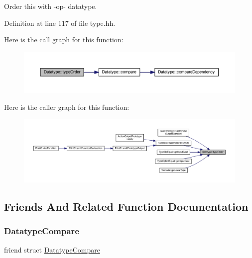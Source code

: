 Order this with -\/op-\/ datatype. 



Definition at line 117 of file type.\+hh.

Here is the call graph for this function\+:
\nopagebreak
\begin{figure}[H]
\begin{center}
\leavevmode
\includegraphics[width=350pt]{class_datatype_a97e8ffb05266d744b2a63d20a76a9974_cgraph}
\end{center}
\end{figure}
Here is the caller graph for this function\+:
\nopagebreak
\begin{figure}[H]
\begin{center}
\leavevmode
\includegraphics[width=350pt]{class_datatype_a97e8ffb05266d744b2a63d20a76a9974_icgraph}
\end{center}
\end{figure}


\subsection{Friends And Related Function Documentation}
\mbox{\label{class_datatype_a86b144569a3593304a32cb5aae3fa3f6}} 
\subsubsection{\texorpdfstring{DatatypeCompare}{DatatypeCompare}}
{\footnotesize\ttfamily friend struct \mbox{\hyperlink{struct_datatype_compare}{Datatype\+Compare}}\hspace{0.3cm}{\ttfamily [friend]}}



